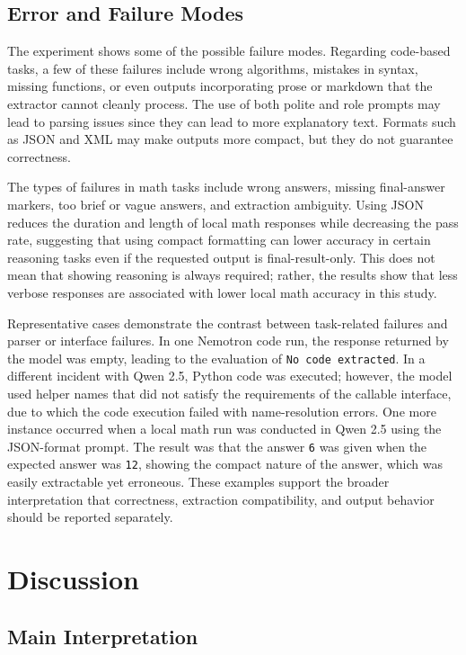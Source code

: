 \documentclass{llncs}
\begin{document}
\subsection{Error and Failure Modes}\label{error-and-failure-modes}

The experiment shows some of the possible failure modes. Regarding code-based tasks, a few of these failures include wrong algorithms, mistakes in syntax, missing functions, or even outputs incorporating prose or markdown that the extractor cannot cleanly process. The use of both polite and role prompts may lead to parsing issues since they can lead to more explanatory text. Formats such as JSON and XML may make outputs more compact, but they do not guarantee correctness.

The types of failures in math tasks include wrong answers, missing final-answer markers, too brief or vague answers, and extraction ambiguity. Using JSON reduces the duration and length of local math responses while decreasing the pass rate, suggesting that using compact formatting can lower accuracy in certain reasoning tasks even if the requested output is final-result-only. This does not mean that showing reasoning is always required; rather, the results show that less verbose responses are associated with lower local math accuracy in this study.

Representative cases demonstrate the contrast between task-related failures and parser or interface failures. In one Nemotron code run, the response returned by the model was empty, leading to the evaluation of \texttt{No code extracted}. In a different incident with Qwen 2.5, Python code was executed; however, the model used helper names that did not satisfy the requirements of the callable interface, due to which the code execution failed with name-resolution errors. One more instance occurred when a local math run was conducted in Qwen 2.5 using the JSON-format prompt. The result was that the answer \texttt{6} was given when the expected answer was \texttt{12}, showing the compact nature of the answer, which was easily extractable yet erroneous. These examples support the broader interpretation that correctness, extraction compatibility, and output behavior should be reported separately.

\section{Discussion}
\subsection{Main Interpretation}\label{main-interpretation}
\end{document}
